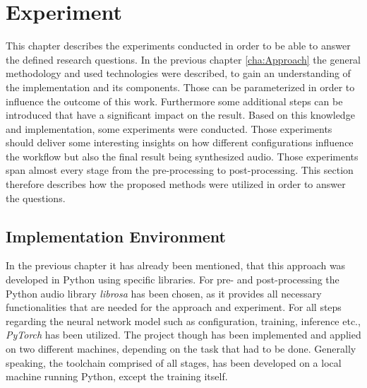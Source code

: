 \chapter{Experiment}
\label{cha:Experiment}
This chapter describes the experiments conducted in order to be able to answer the defined research questions. In the previous chapter \ref{cha:Approach} the general methodology and used technologies were described, to gain an understanding of the implementation and its components. Those can be parameterized in order to influence the outcome of this work. Furthermore some additional steps can be introduced that have a significant impact on the result. Based on this knowledge and implementation, some experiments were conducted. Those experiments should deliver some interesting insights on how different configurations influence the workflow but also the final result being synthesized audio. Those experiments span almost every stage from the pre-processing to post-processing. This section therefore describes how the proposed methods were utilized in order to answer the questions.







\section{Implementation Environment}
In the previous chapter it has already been mentioned, that this approach was developed in Python using specific libraries. For pre- and post-processing the Python audio library \textit{librosa} \cite{brian_mcfee_2022_6097378} has been chosen, as it provides all necessary functionalities that are needed for the approach and experiment. For all steps regarding the neural network model such as configuration, training, inference etc., \textit{PyTorch} \cite{paszke2019pytorch} has been utilized. The project though has been implemented and applied on two different machines, depending on the task that had to be done. Generally speaking, the toolchain comprised of all stages, has been developed on a local machine running Python, except the training itself. 

